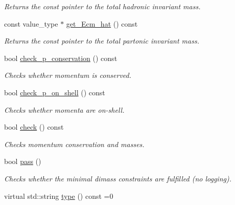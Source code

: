 \begin{DoxyCompactItemize}
\begin{DoxyCompactList}\small\item\em Returns the const pointer to the total hadronic invariant mass. \end{DoxyCompactList}\item 
\hypertarget{a00441_a98ef07838819ee024376ca18407c94e7}{const value\-\_\-type $\ast$ \hyperlink{a00441_a98ef07838819ee024376ca18407c94e7}{get\-\_\-\-Ecm\-\_\-hat} () const }\label{a00441_a98ef07838819ee024376ca18407c94e7}

\begin{DoxyCompactList}\small\item\em Returns the const pointer to the total partonic invariant mass. \end{DoxyCompactList}\item 
\hypertarget{a00441_ad9b77d74cfcac649bcfeb21e20cfd3a6}{bool \hyperlink{a00441_ad9b77d74cfcac649bcfeb21e20cfd3a6}{check\-\_\-p\-\_\-conservation} () const }\label{a00441_ad9b77d74cfcac649bcfeb21e20cfd3a6}

\begin{DoxyCompactList}\small\item\em Checks whether momentum is conserved. \end{DoxyCompactList}\item 
\hypertarget{a00441_a369ca024b5d8ca76944c637750fff5ee}{bool \hyperlink{a00441_a369ca024b5d8ca76944c637750fff5ee}{check\-\_\-p\-\_\-on\-\_\-shell} () const }\label{a00441_a369ca024b5d8ca76944c637750fff5ee}

\begin{DoxyCompactList}\small\item\em Checks whether momenta are on-\/shell. \end{DoxyCompactList}\item 
\hypertarget{a00441_a5f12a5f451e7abb67dbf320df444b458}{bool \hyperlink{a00441_a5f12a5f451e7abb67dbf320df444b458}{check} () const }\label{a00441_a5f12a5f451e7abb67dbf320df444b458}

\begin{DoxyCompactList}\small\item\em Checks momentum conservation and masses. \end{DoxyCompactList}\item 
bool \hyperlink{a00441_a24a50f42820c055aae4511f14e032b93}{pass} ()
\begin{DoxyCompactList}\small\item\em Checks whether the minimal dimass constraints are fulfilled (no logging). \end{DoxyCompactList}\item 
\hypertarget{a00441_a4f41294f49ce983a674749cf92f23b7c}{virtual std\-::string \hyperlink{a00441_a4f41294f49ce983a674749cf92f23b7c}{type} () const =0}\label{a00441_a4f41294f49ce983a674749cf92f23b7c}


\end{DoxyCompactItemize}
